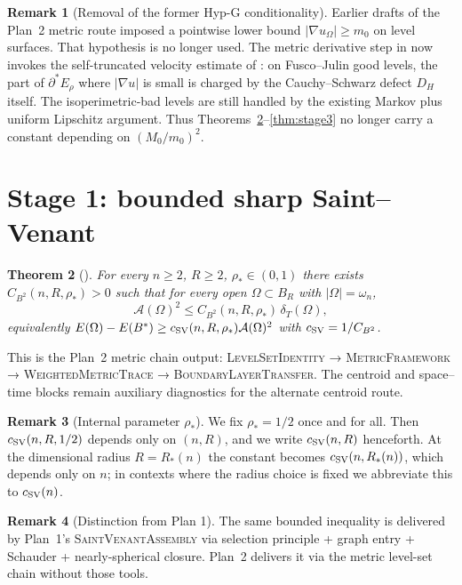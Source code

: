 \documentclass[11pt]{article}
\newtheorem{theorem}{Theorem}[section]
\theoremstyle{definition}
\newtheorem{remark}[theorem]{Remark}
\newcommand{\Fr}{\mathcal{A}}
\newcommand{\Om}{\Omega}
\newcommand{\rstar}{\rho_{*}}
\newcommand{\Bstar}{B^{*}}
\begin{document}
\begin{remark}[Removal of the former Hyp-G conditionality]\label{rem:hypG}
Earlier drafts of the Plan~2 metric route imposed a pointwise lower
bound $|\nabla u_\Om|\ge m_0$ on level surfaces.  That hypothesis is no
longer used.  The metric derivative step in \cite{WeightedMetricTrace}
now invokes the self-truncated velocity estimate of
\cite{TrimmedVelocityRepair}: on Fusco--Julin good levels, the part of
$\partial^*E_\rho$ where $|\nabla u|$ is small is charged by the
Cauchy--Schwarz defect $D_H$ itself.  The isoperimetric-bad levels are
still handled by the existing Markov plus uniform Lipschitz argument.
Thus Theorems~\ref{thm:stage1}--\ref{thm:stage3} no longer carry a
constant depending on $(M_0/m_0)^2$.
\end{remark}

\section{Stage 1: bounded sharp Saint--Venant}\label{sec:stage1}

\begin{theorem}[\cite{BoundaryLayerTransfer}]\label{thm:stage1}
For every $n\ge 2$, $R\ge 2$, $\rstar\in(0,1)$ there exists
$C_{B^2}(n,R,\rstar)>0$ such that for every open $\Om\subset B_R$ with
$|\Om|=\omega_n$,
\begin{equation}\label{eq:stage1}
   \Fr(\Om)^2\le C_{B^2}(n,R,\rstar)\,\delta_T(\Om),
\end{equation}
equivalently
$E(\Om)-E(\Bstar)\ge c_{\rm SV}(n,R,\rstar)\Fr(\Om)^2$ with
$c_{\rm SV}=1/C_{B^2}$.
\end{theorem}

This is the Plan~2 metric chain output:
\textsc{LevelSetIdentity} →
\textsc{MetricFramework} →
\textsc{WeightedMetricTrace} →
\textsc{BoundaryLayerTransfer}.  The centroid and space--time blocks remain
auxiliary diagnostics for the alternate centroid route.

\begin{remark}[Internal parameter $\rstar$]\label{rem:rho-star}
We fix $\rstar=1/2$ once and for all. Then $c_{\rm SV}(n,R,1/2)$
depends only on $(n,R)$, and we write $c_{\rm SV}(n,R)$ henceforth.
At the dimensional radius $R=R_*(n)$ the constant becomes
$c_{\rm SV}(n,R_*(n))$, which depends only on $n$; in contexts where
the radius choice is fixed we abbreviate this to $c_{\rm SV}(n)$.
\end{remark}

\begin{remark}[Distinction from Plan 1]
The same bounded inequality is delivered by Plan~1's
\textsc{SaintVenantAssembly} \cite{BDV-SaintVenantAssembly} via
selection principle + graph entry + Schauder + nearly-spherical
closure. Plan~2 delivers it via the metric level-set chain without
those tools.
\end{remark}
\end{document}
